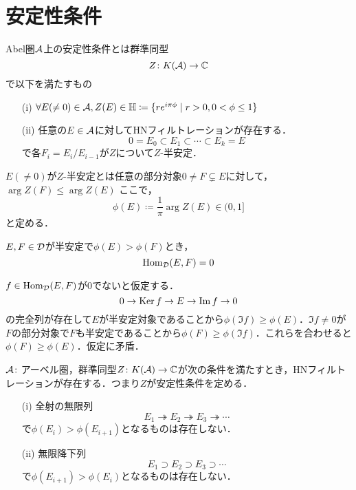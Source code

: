 \section{安定性条件}
	

\begin{defn}\cite{BridgelandStab}
		Abel圏${\mathcal A}$上の安定性条件とは群準同型
		\[Z\colon K({\mathcal A})\to {\mathbb C}\]
		で以下を満たすもの
\begin{itemize}
	\item[(i)]
		$\forall E(\neq 0)\in{\mathcal A}, Z(E)\in{\mathbb H}\coloneq \{re^{i\pi\phi}\mid r>0, 0<\phi \le 1\}$
	\item[(ii)]
		任意の$E\in{\mathcal A}$に対してHNフィルトレーションが存在する．
		\[0=E_0\subset E_1\subset \cdots \subset E_k = E\]
		で各$F_i = E_i/E_{i-1}$が$Z$について$Z$-半安定．
\end{itemize}
$E(\neq 0)$が$Z$-半安定とは任意の部分対象$0\neq F\subsetneq E$に対して，$\arg Z(F) \le \arg Z(E)$
ここで，
\[\phi(E)\coloneq \frac{1}{\pi}\arg Z(E)\in (0,1] \]
と定める．
\end{defn}	

\begin{lemm}
	$E,F\in{\mathcal D}$が半安定で$\phi(E)>\phi(F)$とき，
	\[\operatorname{\mathrm{Hom}}_{{\mathcal D}}(E,F)=0\]
\end{lemm}
\begin{pf}
	$f\in\operatorname{\mathrm{Hom}}_{{\mathcal D}}(E,F)$が$0$でないと仮定する．
	\[0\rightarrow\operatorname{Ker} f\rightarrow E \rightarrow \Im f \rightarrow 0\]
	の完全列が存在して$E$が半安定対象であることから$\phi(\Im f)\ge\phi(E)$．$\Im f\neq 0$が$F$の部分対象で$F$も半安定であることから$\phi(F)\ge\phi(\Im f)$．これらを合わせると$\phi(F)\ge\phi(E)$．仮定に矛盾．
\end{pf}

\begin{lemm}\cite{BridgelandStab}
		${\mathcal A}\colon$アーベル圏，群準同型$Z\colon K({\mathcal A})\to {\mathbb C}$が次の条件を満たすとき，HNフィルトレーションが存在する．つまり$Z$が安定性条件を定める．
		\begin{itemize}
			\item[(i)]
			全射の無限列
		\[E_1\twoheadrightarrow E_2\twoheadrightarrow E_3\twoheadrightarrow\cdots  \]
		で$\phi (E_i)> \phi (E_{i+1})$となるものは存在しない．
	\item[(ii)]
			無限降下列
		\[E_1\supset E_2\supset E_3\supset \cdots  \]
		で$\phi (E_{i+1}) > \phi(E_i)$となるものは存在しない．
	\end{itemize}
\end{lemm}

